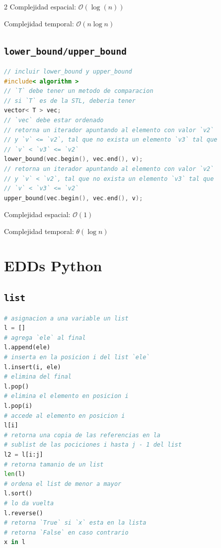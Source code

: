 \documentclass{article}
\newcommand{\bigO}{\mathcal{O}}
\begin{document}
\begin{multicols}{2}
Complejidad espacial: $\bigO(\log(n))$

Complejidad temporal: $\bigO(n \log n)$

\subsection*{\tt \footnotesize lower\_bound/upper\_bound}
\begin{lstlisting}[language=C++]
// incluir lower_bound y upper_bound
#include< algorithm >
// `T` debe tener un metodo de comparacion
// si `T` es de la STL, deberia tener
vector< T > vec;
// `vec` debe estar ordenado
// retorna un iterador apuntando al elemento con valor `v2`
// y `v` <= `v2`, tal que no exista un elemento `v3` tal que
// `v` < `v3` <= `v2`
lower_bound(vec.begin(), vec.end(), v);
// retorna un iterador apuntando al elemento con valor `v2`
// y `v` < `v2`, tal que no exista un elemento `v3` tal que
// `v` < `v3` <= `v2`
upper_bound(vec.begin(), vec.end(), v);
\end{lstlisting}

Complejidad espacial: $\bigO(1)$

Complejidad temporal: $\theta(\log n)$
\section*{\small EDDs Python}

\subsection*{\tt \footnotesize list}
\begin{lstlisting}[language=Python]
# asignacion a una variable un list
l = []
# agrega `ele` al final
l.append(ele)
# inserta en la posicion i del list `ele`
l.insert(i, ele)
# elimina del final 
l.pop()
# elimina el elemento en posicion i
l.pop(i)
# accede al elemento en posicion i
l[i]
# retorna una copia de las referencias en la 
# sublist de las pociciones i hasta j - 1 del list
l2 = l[i:j]
# retorna tamanio de un list
len(l)
# ordena el list de menor a mayor
l.sort()
# lo da vuelta
l.reverse()
# retorna `True` si `x` esta en la lista
# retorna `False` en caso contrario
x in l
\end{lstlisting}



\end{multicols}
\end{document}
